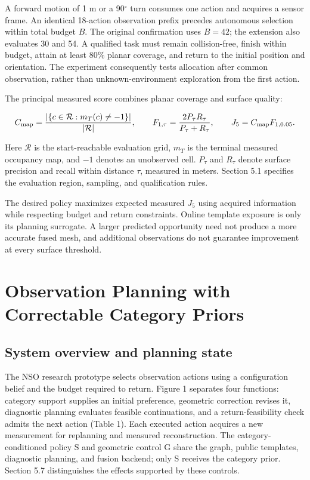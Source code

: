 \documentclass[11pt,a4paper]{article}
\providecommand{\hypertarget}[2]{#2}
\begin{document}
A forward motion of 1 m or a 90\ensuremath{^{\circ}} turn consumes one action and acquires a sensor frame. An identical 18-action observation prefix precedes autonomous selection within total budget \(B\). The original confirmation uses \(B=42\); the extension also evaluates 30 and 54. A qualified task must remain collision-free, finish within budget, attain at least 80\% planar coverage, and return to the initial position and orientation. The experiment consequently tests allocation after common observation, rather than unknown-environment exploration from the first action.

The principal measured score combines planar coverage and surface quality:

\[
C_{\rm map}=\frac{|\{c\in\mathcal R:m_T(c)\ne-1\}|}{|\mathcal R|},
\qquad F_{1,\tau}=\frac{2P_\tau R_\tau}{P_\tau+R_\tau},
\qquad J_5=C_{\rm map}F_{1,0.05}.
\]

Here \(\mathcal R\) is the start-reachable evaluation grid, \(m_T\) is the terminal measured occupancy map, and \(-1\) denotes an unobserved cell. \(P_\tau\) and \(R_\tau\) denote surface precision and recall within distance \(\tau\), measured in meters. Section 5.1 specifies the evaluation region, sampling, and qualification rules.

The desired policy maximizes expected measured \(J_5\) using acquired information while respecting budget and return constraints. Online template exposure is only its planning surrogate. A larger predicted opportunity need not produce a more accurate fused mesh, and additional observations do not guarantee improvement at every surface threshold.

\hypertarget{observation-planning-with-correctable-category-priors}{%
\section{Observation Planning with Correctable Category Priors}\label{observation-planning-with-correctable-category-priors}}

\hypertarget{system-overview-and-planning-state}{%
\subsection{System overview and planning state}\label{system-overview-and-planning-state}}

The NSO research prototype selects observation actions using a configuration belief and the budget required to return. Figure 1 separates four functions: category support supplies an initial preference, geometric correction revises it, diagnostic planning evaluates feasible continuations, and a return-feasibility check admits the next action (Table 1). Each executed action acquires a new measurement for replanning and measured reconstruction. The category-conditioned policy S and geometric control G share the graph, public templates, diagnostic planning, and fusion backend; only S receives the category prior. Section 5.7 distinguishes the effects supported by these controls.
\end{document}
